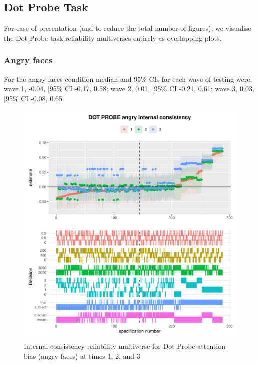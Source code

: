 \documentclass[
  english,
  man,floatsintext]{apa6}
\begin{document}
\hypertarget{dot-probe-task-1}{%
\subsection{Dot Probe Task}\label{dot-probe-task-1}}

For ease of presentation (and to reduce the total number of figures), we visualise the Dot Probe task reliability multiverses entirely as overlapping plots.

\hypertarget{angry-faces}{%
\subsubsection{Angry faces}\label{angry-faces}}

For the angry faces condition median and 95\% CIs for each wave of testing were; wave 1, -0.04, {[}95\% CI -0.17, 0.58; wave 2, 0.01, {[}95\% CI -0.21, 0.61; wave 3, 0.03, {[}95\% CI -0.08, 0.65.

\begin{figure}
\centering
\includegraphics{Reliability_Multiverse_files/figure-latex/unnamed-chunk-13-1.pdf}
\caption{\label{fig:unnamed-chunk-13}Internal consistency reliability multiverse for Dot Probe attention bias (angry faces) at times 1, 2, and 3}
\end{figure}
\end{document}
